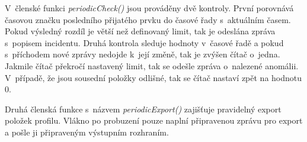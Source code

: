 \begin{itemize}
 V~členské funkci \textit{periodicCheck()} jsou prováděny dvě kontroly. První porovnává
 časovou značku posledního přijatého prvku do časové řady s~aktuálním časem. Pokud výsledný rozdíl je větší
 než definovaný limit, tak je odeslána zpráva s~popisem incidentu. Druhá kontrola sleduje hodnoty
 v~časové řadě a pokud s~příchodem nové zprávy nedojde k~její změně, tak je zvýšen čítač o~jedna. 
 Jakmile čítač překročí nastavený limit, tak se odešle zpráva o~nalezené anomálii. V~případě,
 že jsou sousední položky odlišné, tak se čítač nastaví zpět na hodnotu 0.
 
 Druhá členská funkce s~názvem \textit{periodicExport()} zajišťuje pravidelný export položek profilu.
 Vlákno po probuzení pouze naplní připravenou zprávu pro export a pošle ji připraveným výstupním
 rozhraním.
 
\end{itemize}